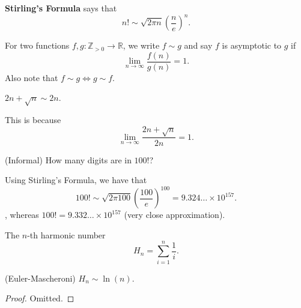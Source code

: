 
\begin{theorem}
	\textbf{Stirling's Formula} says that \[
		n! \sim \sqrt{2\pi n} \left( \frac{n}{e} \right) ^{n} 
	.\] 
\end{theorem}

\begin{definition}
	For two functions \( f,g:\mathbb{Z}_{>0} \to \mathbb{R} \), we write \( f \sim g \) and say \( f \) is asymptotic to \( g \) if \[
		\lim_{n \to \infty} \frac{f(n)}{g(n)} = 1
	.\] Also note that \( f\sim g \iff g \sim f \).
\end{definition}

\begin{eg}
	\( 2n + \sqrt{n} \sim 2n \).
\end{eg}
\begin{explanation}
	This is because \[
		\lim_{n \to \infty} \frac{2n+\sqrt{n} }{2n} = 1
	.\] 
\end{explanation}

\begin{eg}
	(Informal) How many digits are in \( 100! \)?
\end{eg}
\begin{explanation}
	Using Stirling's Formula, we have that \[
		100! \sim \sqrt{2\pi 100} \left( \frac{100}{e} \right) ^{100} = 9.324\ldots \times 10^{157}  
	.\], whereas \( 100! = 9.332\ldots  \times 10^{157}  \) (very close approximation).
\end{explanation}

\begin{definition}
	The \( n \)-th harmonic number \[
		H_n=\sum_{i=1}^{n} \frac{1}{i}
	.\] 
\end{definition}

\begin{theorem}
	(Euler-Mascheroni) \( H_n \sim \ln (n) \).
\end{theorem}
\begin{proof}
	Omitted.
\end{proof}

